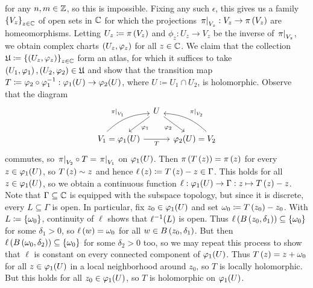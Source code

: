 \documentclass[../Moduli_Spaces_of_Riemann_Surfaces.tex]{subfiles}
\begin{document}
\begin{example}
\begin{equation*}
        \end{equation*}
        for any $n,m\in\mathbb{Z}$, so this is impossible. Fixing any such $\epsilon$, this gives us a family $\left\{V_z\right\}_{z\in\mathbb{C}}$ of open sets in $\mathbb{C}$ for which the projections $\left.\pi\right|_{V_z}:V_z\to\pi\left(V_z\right)$ are homeomorphisms. Letting $U_z\coloneqq\pi\left(V_z\right)$ and $\phi_z:U_z\to V_z$ be the inverse of $\left.\pi\right|_{V_z}$, we obtain complex charts $\left(U_z,\varphi_z\right)$ for all $z\in\mathbb{C}$. We claim that the collection $\mathfrak{U}\coloneqq\left\{\left(U_z,\varphi_z\right)\right\}_{z\in\mathbb{C}}$ form an atlas, for which it suffices to take $\left(U_1,\varphi_1\right),\left(U_2,\varphi_2\right)\in\mathfrak{U}$ and show that the transition map $T\coloneqq\varphi_2\circ\varphi_1^{-1}:\varphi_1\!\left(U\right)\to\varphi_2\!\left(U\right)$, where $U\coloneqq U_1\cap U_2$, is holomorphic. Observe that the diagram
        \begin{equation*}
            \begin{tikzcd}[column sep=0.1in]
                & U \ar[dl, "\phi_1"] \ar[dr, "\phi_2"'] \\
                V_1=\phi_1(U) \ar[ur, "\l.\pi\r|_{V_1}", bend left=20, start anchor={[xshift=-20px]}] \ar[rr, "T"'] & & \phi_2(U)=V_2 \ar[ul, "\l.\pi\r|_{V_2}"', bend right=20, start anchor={[xshift=20px]}]
            \end{tikzcd}
        \end{equation*}
        commutes, so $\left.\pi\right|_{V_2}\circ T=\left.\pi\right|_{V_1}$ on $\varphi_1\!\left(U\right)$. Then $\pi\left(T\left(z\right)\right)=\pi\left(z\right)$ for every $z\in\varphi_1\!\left(U\right)$, so $T\left(z\right)\sim z$ and hence $\ell\left(z\right)\coloneqq T\left(z\right)-z\in\Gamma$. This holds for all $z\in\varphi_1\!\left(U\right)$, so we obtain a continuous function $\ell:\varphi_1\!\left(U\right)\to\Gamma:z\mapsto T\left(z\right)-z$. Note that $\Gamma\subseteq\mathbb{C}$ is equipped with the subspace topology, but since it is discrete, every $L\subseteq\Gamma$ is open. In particular, fix $z_0\in\varphi_1\!\left(U\right)$ and set $\omega_0\coloneqq T\left(z_0\right)-z_0$. With $L\coloneqq\left\{\omega_0\right\}$, continuity of $\ell$ shows that $\ell^{-1}\!\left(L\right)$ is open. Thus $\ell\left(B\left(z_0,\delta_1\right)\right)\subseteq\left\{\omega_0\right\}$ for some $\delta_1>0$, so $\ell\left(w\right)=\omega_0$ for all $w\in B\left(z_0,\delta_1\right)$. But then $\ell\left(B\left(\omega_0,\delta_2\right)\right)\subseteq\left\{\omega_0\right\}$ for some $\delta_2>0$ too, so we may repeat this process to show that $\ell$ is constant on every connected component of $\varphi_1\!\left(U\right)$. Thus $T\left(z\right)=z+\omega_0$ for all $z\in\varphi_1\!\left(U\right)$ in a local neighborhood around $z_0$, so $T$ is locally holomorphic. But this holds for all $z_0\in\varphi_1\!\left(U\right)$, so $T$ is holomorphic on $\varphi_1\!\left(U\right)$.\exqed
    \end{example}
\end{document}
